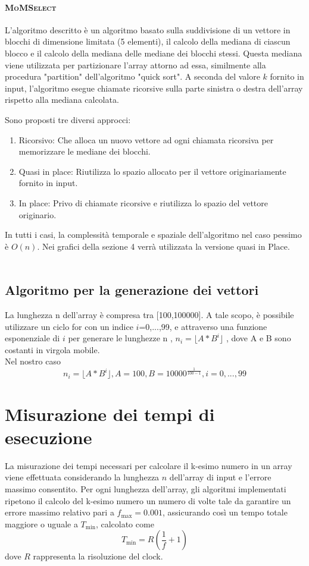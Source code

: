 \documentclass[a4paper]{article}
\newcommand{\MoMSelect}{\textsc{MoMSelect}}
\begin{document}
\paragraph{\MoMSelect}
L'algoritmo descritto è un algoritmo basato sulla suddivisione di un vettore in blocchi di dimensione limitata (5 elementi), il calcolo della mediana di ciascun blocco e il calcolo della mediana delle mediane dei blocchi stessi. Questa mediana viene utilizzata per partizionare l'array attorno ad essa, similmente alla procedura "partition" dell'algoritmo "quick sort". A seconda del valore \( k \) fornito in input, l'algoritmo esegue chiamate ricorsive sulla parte sinistra o destra dell'array rispetto alla mediana calcolata. 

Sono proposti tre diversi approcci:
\begin{enumerate}
    \item Ricorsivo: Che alloca un nuovo vettore ad ogni chiamata ricorsiva per memorizzare le mediane dei blocchi.
    \item Quasi in place: Riutilizza lo spazio allocato per il vettore originariamente fornito in input.
    \item In place: Privo di chiamate ricorsive e riutilizza lo spazio del vettore originario.
\end{enumerate}
In tutti i casi, la complessità temporale e spaziale dell'algoritmo nel caso pessimo è \( O(n) \). Nei grafici della sezione 4 verrà utilizzata la versione quasi in Place.\\
\\
\subsection{Algoritmo per la generazione dei vettori}
La lunghezza n dell'array è compresa tra [100,100000].
A tale scopo, è possibile utilizzare un ciclo for con un indice $i$=0,...,99, e attraverso una funzione esponenziale di $i$ per generare le lunghezze n
, $n_i=\lfloor A*B^i\rfloor$ , dove A e B sono costanti in virgola mobile.\\
Nel nostro caso \[n_i=\lfloor A*B^i\rfloor, A=100, B=10000^{\frac{1}{100-1}},i=0,...,99\]

\section{Misurazione dei tempi di esecuzione}
\label{sec:misurazione}
La misurazione dei tempi necessari per calcolare il k-esimo numero in un array viene effettuata considerando la lunghezza \( n \) dell'array di input e l'errore massimo consentito. Per ogni lunghezza dell'array, gli algoritmi implementati ripetono il calcolo del k-esimo numero un numero di volte tale da garantire un errore massimo relativo pari a \( f_{\max} = 0.001 \), assicurando così un tempo totale maggiore o uguale a \( T_{\min} \), calcolato come \[ T_{\min} = R \left( \frac{1}{f} + 1 \right) \] dove \( R \) rappresenta la risoluzione del clock.
\end{document}
